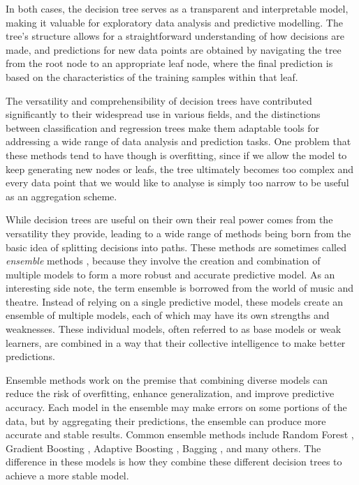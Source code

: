 In both cases, the decision tree serves as a transparent and interpretable model, making it valuable for exploratory data analysis and predictive modelling. The tree's structure allows for a straightforward understanding of how decisions are made, and predictions for new data points are obtained by navigating the tree from the root node to an appropriate leaf node, where the final prediction is based on the characteristics of the training samples within that leaf.

The versatility and comprehensibility of decision trees have contributed significantly to their widespread use in various fields, and the distinctions between classification and regression trees make them adaptable tools for addressing a wide range of data analysis and prediction tasks. One problem that these methods tend to have though is overfitting, since if we allow the model to keep generating new nodes or leafs, the tree ultimately becomes too complex and every data point that we would like to analyse is simply too narrow to be useful as an aggregation scheme. 

While decision trees are useful on their own their real power comes from the versatility they provide, leading to a wide range of methods being born from the basic idea of splitting decisions into paths. These methods are sometimes called \textit{ensemble} methods , because they involve the creation and combination of multiple models to form a more robust and accurate predictive model. As an interesting side note, the term ensemble is borrowed from the world of music and theatre. Instead of relying on a single predictive model, these models create an ensemble of multiple models, each of which may have its own strengths and weaknesses. These individual models, often referred to as base models or weak learners, are combined in a way that  their collective intelligence to make better predictions.

Ensemble methods work on the premise that combining diverse models can reduce the risk of overfitting, enhance generalization, and improve predictive accuracy. Each model in the ensemble may make errors on some portions of the data, but by aggregating their predictions, the ensemble can produce more accurate and stable results. Common ensemble methods include Random Forest , Gradient Boosting , Adaptive Boosting , Bagging , and many others. The difference in these models is how they combine these different decision trees to achieve a more stable model.  

